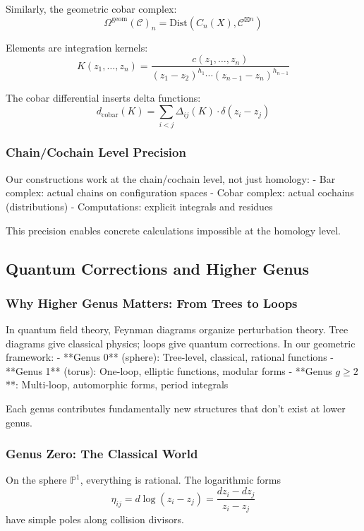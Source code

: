 Similarly, the geometric cobar complex:
$$\Omega^{\text{geom}}(\mathcal{C})_n = \text{Dist}(C_n(X), \mathcal{C}^{\boxtimes n})$$

Elements are integration kernels:
$$K(z_1, \ldots, z_n) = \frac{c(z_1, \ldots, z_n)}{(z_1-z_2)^{h_1} \cdots (z_{n-1}-z_n)^{h_{n-1}}}$$

The cobar differential inserts delta functions:
$$d_{\text{cobar}}(K) = \sum_{i<j} \Delta_{ij}(K) \cdot \delta(z_i - z_j)$$

\subsubsection{Chain/Cochain Level Precision}

Our constructions work at the chain/cochain level, not just homology:
- Bar complex: actual chains on configuration spaces  
- Cobar complex: actual cochains (distributions)
- Computations: explicit integrals and residues

This precision enables concrete calculations impossible at the homology level.

\subsection{Quantum Corrections and Higher Genus}

\subsubsection{Why Higher Genus Matters: From Trees to Loops}

In quantum field theory, Feynman diagrams organize perturbation theory. Tree diagrams give classical physics; loops give quantum corrections. In our geometric framework:
- **Genus 0** (sphere): Tree-level, classical, rational functions
- **Genus 1** (torus): One-loop, elliptic functions, modular forms
- **Genus $g \geq 2$**: Multi-loop, automorphic forms, period integrals

Each genus contributes fundamentally new structures that don't exist at lower genus.

\subsubsection{Genus Zero: The Classical World}

On the sphere $\mathbb{P}^1$, everything is rational. The logarithmic forms
$$\eta_{ij} = d\log(z_i - z_j) = \frac{dz_i - dz_j}{z_i - z_j}$$
have simple poles along collision divisors.

